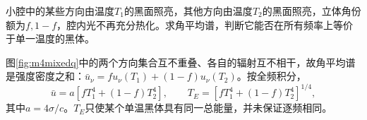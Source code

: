 \begin{example}\label{ex:m4mixedcavity}
小腔中的某些方向由温度$T_1$的黑面照亮，其他方向由温度$T_2$的黑面照亮，立体角份额为$f,1-f$，腔内光不再充分热化。求角平均谱，判断它能否在所有频率上等价于单一温度的黑体。
\end{example}
\begin{solution}
图\ref{fig:m4mixedq}中的两个方向集合互不重叠、各自的辐射互不相干，故角平均谱是强度密度之和：$\bar u_\nu=fu_\nu(T_1)+(1-f)u_\nu(T_2)$。按全频积分，
\[
 \bar u=a[fT_1^4+(1-f)T_2^4],\qquad
 T_E=[fT_1^4+(1-f)T_2^4]^{1/4},
\]
其中$a=4\sigma/c$。$T_E$只使某个单温黑体具有同一总能量，并未保证逐频相同。
\end{solution}
